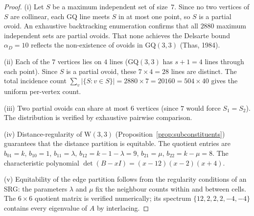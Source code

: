 \documentclass[12pt,a4paper]{article}
\newcommand{\W}{\mathrm{W}(3,3)}
\begin{document}
\begin{proof}
(i) Let $S$ be a maximum independent set of size~$7$.
Since no two vertices of $S$ are collinear, each GQ line meets $S$
in at most one point, so $S$ is a partial ovoid.
An exhaustive backtracking enumeration confirms that all $2880$
maximum independent sets are partial ovoids.
That none achieves the Delsarte bound $\alpha_D = 10$ reflects
the non-existence of ovoids in $\mathrm{GQ}(3,3)$ (Thas, 1984).

(ii) Each of the $7$ vertices lies on $4$ lines (GQ$(3,3)$ has
$s+1 = 4$ lines through each point).  Since $S$ is a partial ovoid,
these $7 \times 4 = 28$ lines are distinct.
The total incidence count $\sum_v |\{S : v \in S\}| = 2880 \times 7
= 20160 = 504 \times 40$ gives the uniform per-vertex count.

(iii) Two partial ovoids can share at most $6$ vertices
(since $7$ would force $S_1 = S_2$).
The distribution is verified by exhaustive pairwise comparison.

(iv) Distance-regularity of $\W$ (Proposition~\ref{prop:subconstituents})
guarantees that the distance partition is equitable.
The quotient entries are $b_{01} = k$, $b_{10} = 1$, $b_{11} = \lambda$,
$b_{12} = k - 1 - \lambda = 9$, $b_{21} = \mu$, $b_{22} = k - \mu = 8$.
The characteristic polynomial $\det(B - xI) = (x-12)(x-2)(x+4)$.

(v) Equitability of the edge partition follows from the regularity
conditions of an SRG: the parameters $\lambda$ and $\mu$ fix the
neighbour counts within and between cells.
The $6 \times 6$ quotient matrix is verified numerically; its spectrum
$\{12, 2, 2, 2, -4, -4\}$ contains every eigenvalue of $A$
by interlacing.
\end{proof}
\end{document}
